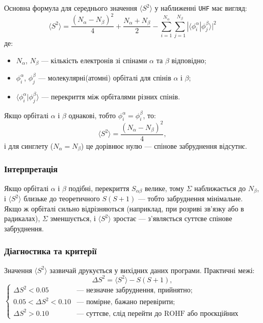 Основна формула для середнього значення $\langle S^2 \rangle$ у наближенні \texttt{UHF} має вигляд:
\[
\boxed{
\langle S^2 \rangle =
\frac{(N_\alpha - N_\beta)^2}{4}
+ \frac{N_\alpha + N_\beta}{2}
- \sum_{i=1}^{N_\alpha} \sum_{j=1}^{N_\beta}
|\langle \phi_i^\alpha | \phi_j^\beta \rangle|^2
}
\]
де:
\begin{itemize}
    \item $N_\alpha$, $N_\beta$ — кількість електронів зі спінами $\alpha$ та $\beta$ відповідно;
    \item $\phi_i^\alpha$, $\phi_j^\beta$ --- молекулярні(атомні) орбіталі для спінів $\alpha$ і $\beta$;
    \item $\langle \phi_i^\alpha | \phi_j^\beta \rangle$ --- перекриття між орбіталями різних спінів.
\end{itemize}

Якщо орбіталі $\alpha$ і $\beta$ однакові, тобто $\phi_i^\alpha = \phi_i^\beta$, то:
\[
\langle S^2 \rangle = \frac{(N_\alpha - N_\beta)^2}{4},
\]
і для синглету ($N_\alpha = N_\beta$) це дорівнює нулю --- спінове забруднення відсутнє.

\subsubsection*{Інтерпретація}

Якщо орбіталі $\alpha$ і $\beta$ подібні, перекриття $S_{\alpha\beta}$ велике, тому $\Sigma$ наближається до $N_\beta$, і $\langle S^2 \rangle$ близьке до теоретичного $S(S+1)$ — тобто забруднення мінімальне.
Якщо ж орбіталі сильно відрізняються (наприклад, при розриві зв’язку або в радикалах), $\Sigma$ зменшується, і $\langle S^2 \rangle$ зростає — з’являється суттєве спінове забруднення.


\subsubsection*{Діагностика та критерії}

Значення $\langle S^2 \rangle$ зазвичай друкується у вихідних даних програми.
Практичні межі:
\[
\Delta S^2 = \langle S^2 \rangle - S(S+1),
\]
\[
\begin{cases}
\Delta S^2 < 0.05 & \text{— незначне забруднення, прийнятно;}\\
0.05 < \Delta S^2 < 0.10 & \text{— помірне, бажано перевірити;}\\
\Delta S^2 > 0.10 & \text{— суттєве, слід перейти до ROHF або проєкційних методів.}
\end{cases}
\]


